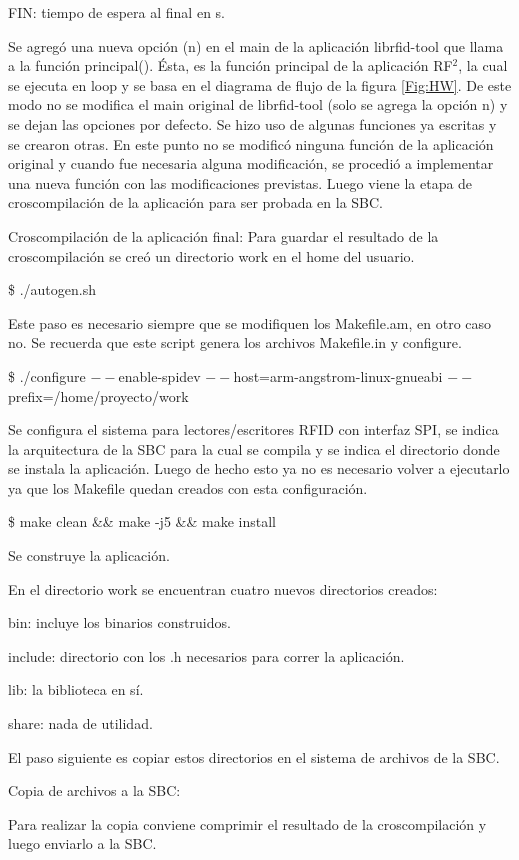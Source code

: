 FIN: tiempo de espera al final en s.


\bigskip
Se agregó una nueva opción (n) en el main de la aplicación librfid-tool que llama a la función principal(). Ésta, es la función principal de la aplicación RF$^{2}$, la cual se ejecuta en loop y se basa en el diagrama de flujo de la figura \ref{Fig:HW}. De este modo no se modifica el main original de librfid-tool (solo se agrega la opción n) y se dejan las opciones por defecto.
Se hizo uso de algunas funciones ya escritas y se crearon otras. En este punto no se modificó ninguna función de la aplicación original y cuando fue necesaria alguna modificación, se procedió a implementar una nueva función con las modificaciones previstas.
Luego viene la etapa de croscompilación de la aplicación para ser probada en la SBC.

\bigskip
Croscompilación de la aplicación final:
Para guardar el resultado de la croscompilación se creó un directorio work en el home del usuario.

\bigskip
\centerline{\$ ./autogen.sh}
Este paso es necesario siempre que se modifiquen los Makefile.am, en otro caso no. Se recuerda que este script genera los archivos Makefile.in y configure.

\bigskip
\centerline{\$ ./configure $--$enable-spidev $--$host=arm-angstrom-linux-gnueabi $--$prefix=/home/proyecto/work}

\bigskip
Se configura el sistema para lectores/escritores RFID con interfaz SPI, se indica la arquitectura de la SBC para la cual se compila y se indica el directorio donde se instala la aplicación. Luego de hecho esto ya no es necesario volver a ejecutarlo ya que los Makefile quedan creados con esta configuración.

\bigskip
\centerline{\$ make clean \&\& make -j5 \&\& make install}
Se construye la aplicación.

\bigskip
En el directorio work se encuentran cuatro nuevos directorios creados:

\bigskip
bin: incluye los binarios construidos.

include: directorio con los .h necesarios para correr la aplicación.

lib: la biblioteca en sí.

share: nada de utilidad.

\bigskip
El paso siguiente es copiar estos directorios en el sistema de archivos de la SBC.

\bigskip
Copia de archivos a la SBC:

\bigskip
Para realizar la copia conviene comprimir el resultado de la croscompilación y luego enviarlo a la SBC.

